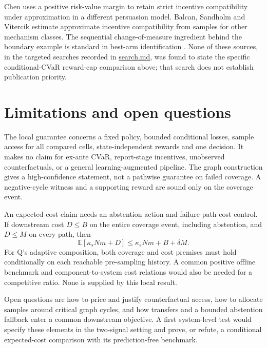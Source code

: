 \documentclass{article}
\begin{document}
Chen \cite{chen2026persuasion} uses a positive risk-value margin to
retain strict incentive compatibility under approximation in a different
persuasion model. Balcan, Sandholm and Vitercik
\cite{balcan2019approximate} estimate approximate incentive compatibility
from samples for other mechanism classes. The sequential change-of-measure
ingredient behind the boundary example is standard in best-arm
identification \cite{kaufmann2016complexity}. None of these sources,
in the targeted searches recorded in \url{search.md}, was found to state
the specific conditional-CVaR reward-cap comparison above; that search
does not establish publication priority.

\section{Limitations and open questions}

The local guarantee concerns a fixed policy, bounded conditional losses,
sample access for all compared cells, state-independent rewards and one
decision. It makes no claim for ex-ante CVaR, report-stage incentives,
unobserved counterfactuals, or a general learning-augmented pipeline.
The graph construction gives a high-confidence statement, not a pathwise
guarantee on failed coverage. A negative-cycle witness and a supporting
reward are sound only on the coverage event.

An expected-cost claim needs an abstention action and failure-path cost
control. If downstream cost \(D\leq B\) on the entire coverage event,
including abstention, and \(D\leq M\) on every path, then
\[
\mathbb E[\kappa_sNm+D]
\leq\kappa_sNm+B+\delta M.
\]
For Q's adaptive composition, both coverage and cost premises must hold
conditionally on each reachable pre-sampling history. A common positive
offline benchmark and component-to-system cost relations would also be
needed for a competitive ratio. None is supplied by this local result.

Open questions are how to price and justify counterfactual access, how to
allocate samples around critical graph cycles, and how transfers and a
bounded abstention fallback enter a common downstream objective. A first
system-level test would specify these elements in the two-signal setting
and prove, or refute, a conditional expected-cost comparison with its
prediction-free benchmark.



\end{document}
